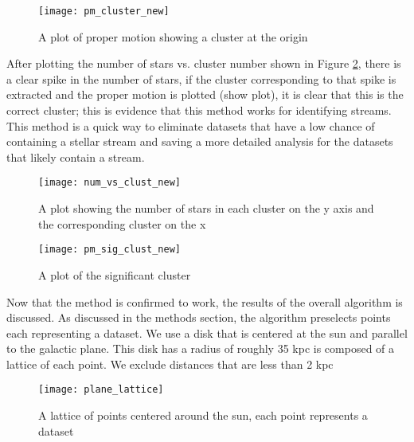 \documentclass[notitlepage,nofootinbib,preprintnumbers,aps,prd]{revtex4-1}
\begin{document}
\FloatBarrier
\begin{figure}[h]
\centering
\texttt{[image: pm\_cluster\_new]}
\caption{A plot of proper motion showing a cluster at the origin}
\label{fig:pmplot}

\end{figure}





\indent After plotting the number of stars vs. cluster number shown in Figure \ref{fig:numclust}, there is a clear spike in the number of stars, if the cluster corresponding to that spike is extracted and the proper motion is plotted (show plot), it is clear that this is the correct cluster; this is evidence that this method works for identifying streams. This method is a quick way to eliminate datasets that have a low chance of containing a stellar stream and saving a more detailed analysis for the datasets that likely contain a stream. 

\FloatBarrier
\begin{figure}[h]
\centering
\texttt{[image: num\_vs\_clust\_new]}
\caption{A plot showing the number of stars in each cluster on the y axis and the corresponding cluster on the x}
\label{fig:numclust}
\end{figure}

\FloatBarrier
\begin{figure}[h]
\centering
\texttt{[image: pm\_sig\_clust\_new]}
\caption{A plot of the significant cluster}
\end{figure}

\indent Now that the method is confirmed to work, the results of the overall algorithm is discussed.
As discussed in the methods section, the algorithm preselects points each representing a dataset. We use a disk that is centered at the sun and parallel to the galactic plane. This disk has a radius of roughly 35 kpc is composed of a lattice of each point. We exclude distances that are less than 2 kpc\\
\FloatBarrier
\begin{figure}[h]
\centering
\texttt{[image: plane\_lattice]}
\caption{A lattice of points centered around the sun, each point represents a dataset}
\end{figure}
\end{document}
